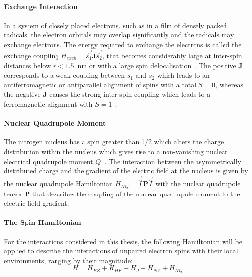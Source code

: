 \paragraph*{Exchange Interaction}
In a system of closely placed electrons, such as in a film of densely packed radicals, the electron orbitals may overlap significantly and the radicals may exchange electrons. The energy required to exchange the electrons is called the exchange coupling $H_{exch} = \vec{\hat{s_1}}\textbf{J}\vec{\hat{s_2}}$, that becomes considerably large at inter-spin distances below $r<1.5$~nm or with a large spin delocalisation~\cite{Schweiger2001_exch}. The positive $\textbf{J}$ corresponds to a weak coupling between $s_1$ and $s_2$ which leads to an antiferromagnetic or antiparallel alignment of spins with a total $S=0$, whereas the negative $\textbf{J}$ causes the strong inter-spin coupling which leads to a ferromagnetic alignment with $S=1$~\cite{Schweiger2001_exch}.\\


\paragraph*{Nuclear Quadrupole Moment}
The nitrogen nucleus has a spin greater than 1/2 which alters the charge distribution within the nucleus which gives rise to a non-vanishing nuclear electrical quadrupole moment $Q$~\cite{Schweiger2001}. The interaction between the asymmetrically distributed charge and the gradient of the electric field at the nucleus is given by the nuclear quadrupole Hamiltonian $H_{NQ}=\vec{\hat{I}}\textbf{P}\vec{\hat{I}}$ with the nuclear quadrupole tensor $\textbf{P}$ that describes the coupling of the nuclear quadrupole moment to the electric field gradient.

\paragraph*{The Spin Hamiltonian}
For the interactions considered in this thesis, the following Hamiltonian will be applied to describe the interactions of unpaired electron spins with their local environments, ranging by their magnitude:
\begin{equation}
H = H_{EZ} + H_{HF} + H_{J} + H_{NZ} + H_{NQ}
\end{equation}

